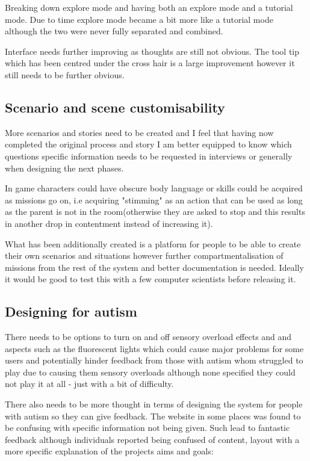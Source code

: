 \documentclass[11pt]{report}
\begin{document}
Breaking down explore mode and having both an explore mode and a tutorial mode. Due to time explore mode became a bit more like a tutorial mode although the two were never fully separated and combined. 

Interface needs further improving as thoughts are still not obvious. The tool tip which has been centred under the cross hair is a large improvement however it still needs to be further obvious. 

\subsection{Scenario and scene customisability}
More scenarios and stories need to be created and I feel that having now completed the original process and story I am better equipped to know which questions specific information needs to be requested in interviews or generally when designing the next phases. 

In game characters could have obscure body language or skills could be acquired as missions go on, i.e acquiring "stimming" as an action that can be used as long as the parent is not in the room(otherwise they are asked to stop and this results in another drop in contentment instead of increasing it).

What has been additionally created is a platform for people to be able to create their own scenarios and situations however further compartmentalisation of missions from the rest of the system and better documentation is needed. Ideally it would be good to test this with a few computer scientists before releasing it.

\subsection{Designing for autism}
There needs to be options to turn on and off sensory overload effects and and aspects such as the fluorescent lights which could cause major problems for some users and  potentially hinder feedback from those with autism whom struggled to play due to causing them sensory overloads although none specified they could not play it at all - just with a bit of difficulty. 

There also needs to be more thought in terms of designing the system for people with autism so they can give feedback. The website in some places was found to be confusing with specific information not being given. Such lead to fantastic feedback although individuals reported being confused of content, layout with a more specific explanation of the projects aims and goals:
\end{document}
